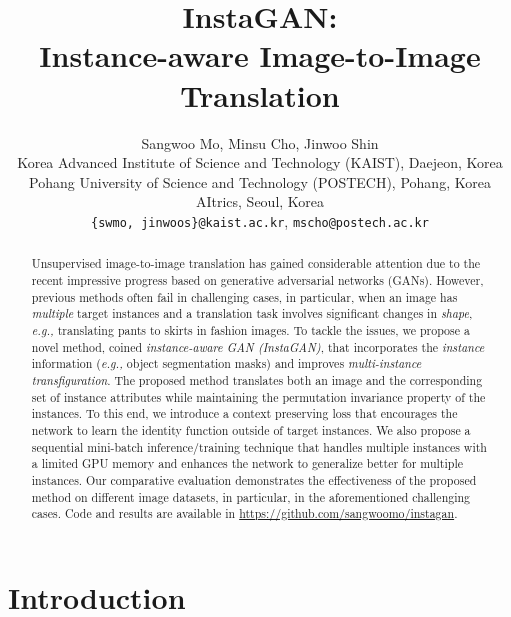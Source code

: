 \documentclass{article} \usepackage{iclr2019_conference,times}
\title{InstaGAN:\\ Instance-aware Image-to-Image Translation}
\author{Sangwoo Mo, Minsu Cho, Jinwoo Shin \\
Korea Advanced Institute of Science and Technology (KAIST), Daejeon, Korea \\
Pohang University of Science and Technology (POSTECH), Pohang, Korea \\
AItrics, Seoul, Korea \\
\texttt{\{swmo, jinwoos\}@kaist.ac.kr}, \quad \texttt{mscho@postech.ac.kr}}
\begin{document}
\maketitle

\vspace{-0.2in}
\begin{abstract}
\vspace{-0.05in}
Unsupervised image-to-image translation has gained considerable attention due to  
the recent impressive progress based on generative adversarial networks (GANs). However, previous methods often fail in challenging cases,
in particular, when an image has \textit{multiple} target instances and a translation task involves significant changes in \textit{shape},  \textit{e.g.,} translating pants to skirts in fashion images. To tackle the issues, we propose a novel method, coined \textit{instance-aware GAN (InstaGAN)},
that incorporates the \textit{instance} information
{(\textit{e.g.,} object  segmentation masks)}
and improves    \textit{multi-instance transfiguration}.
The proposed method translates both an image and the corresponding set of instance attributes while maintaining the permutation invariance property of the instances. To this end, we introduce a context preserving loss that encourages 
the network to learn the identity function outside of target instances.  
We also propose a sequential mini-batch inference/training technique  
that handles multiple instances with a limited GPU memory and enhances the network 
to generalize better for multiple instances. Our comparative evaluation demonstrates the effectiveness of the proposed method on different image datasets, in particular, in the aforementioned challenging cases.
Code and results are available in \url{https://github.com/sangwoomo/instagan}.
\end{abstract}
\vspace{-0.05in}


\vspace{-0.05in}
\section{Introduction}
\label{sec:intro}
\vspace{-0.05in}
\end{document}
